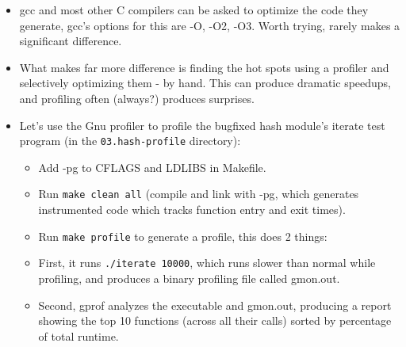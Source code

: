\documentclass[aspectratio=169]{beamer}
\newcommand{\pitem}{\pause \item}
\begin{document}
\begin{frame}[fragile]
    \begin{itemize}
    \item
      \alert{gcc} and most other C compilers can be asked to
      \alert{optimize the code they generate}, gcc's options for this
      are \alert{-O, -O2, -O3}.
      Worth trying, rarely makes a significant difference.
    \pause
    \item
      What makes far more difference is finding the \alert{hot spots}
      using a \alert{profiler} and selectively optimizing them - by hand.
      This can produce dramatic speedups, and profiling often (always?)
      produces surprises.
    \pause
    \item
      Let's use the \alert{Gnu profiler} to profile the bugfixed hash
      module's \alert{iterate} test program
      (in the \verb+03.hash-profile+ directory):
      \begin{itemize}
      \item
        Add -pg to CFLAGS and LDLIBS in Makefile.
      \item
	Run \verb+make clean all+
	(compile and link with \alert{-pg}, which generates instrumented
        code which tracks function entry and exit times).
      \item
	Run \verb+make profile+ to generate a profile, this does 2 things:
      \pitem
	First, it runs \verb+./iterate 10000+, which runs slower than normal
  	while profiling, and produces a binary profiling file
	called \alert{gmon.out}.
      \item
        Second, \alert{gprof} analyzes the executable and \alert{gmon.out},
        producing a report showing the top 10 functions
        (across all their calls) sorted by percentage of total runtime.
      \end{itemize}
    \end{itemize}
\end{frame}
\end{document}
